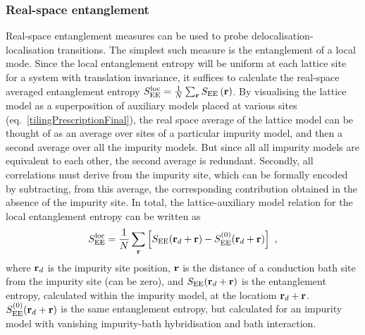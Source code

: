 \documentclass[reprint,hidelinks,onecolumn]{revtex4-2}
\begin{document}
\subsubsection{Real-space entanglement}
Real-space entanglement measures can be used to probe delocalisation-localisation transitions. The simplest such measure is the entanglement of a local mode. Since the local entanglement entropy will be uniform at each lattice site for a system with translation invariance, it suffices to calculate the real-space averaged entanglement entropy \(S_\text{EE}^\text{loc} = \frac{1}{N}\sum_{{\bf r}}S_\text{EE}\left( {\bf r} \right) \). By visualising the lattice model as a superposition of auxiliary models placed at various sites (eq.~\ref{tilingPrescriptionFinal}), the real space average of the lattice model can be thought of as an average over sites of a particular impurity model, and then a second average over all the impurity models. But since all all impurity models are equivalent to each other, the second average is redundant. Secondly, all correlations must derive from the impurity site, which can be formally encoded by subtracting, from this average, the corresponding contribution obtained in the absence of the impurity site. In total, the lattice-auxiliary model relation for the local entanglement entropy can be written as
\begin{equation}\begin{aligned}
	S_\text{EE}^\text{loc} = \frac{1}{N}\sum_{{\bf r}}\left[S_\text{EE}({\bf r}_d + {\bf r}) - S_\text{EE}^{(0)}({\bf r}_d + {\bf r})\right] ~,
\end{aligned}\end{equation}
where \({\bf r}_d\) is the impurity site position, \({\bf r}\) is the distance of a conduction bath site from the impurity site (can be zero), and \(S_\text{EE}({\bf r}_d + {\bf r})\) is the entanglement entropy, calculated within the impurity model, at the locatiom \({\bf r}_d + {\bf r}\). \(S^{(0)}_\text{EE}({\bf r}_d + {\bf r})\) is the same entanglement entropy, but calculated for an impurity model with vanishing impurity-bath hybridisation and bath interaction.
\end{document}
